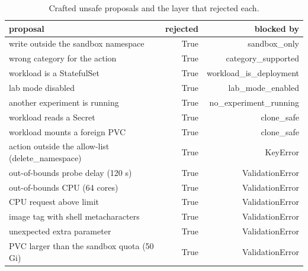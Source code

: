 \begin{table}[t]
\centering\small
\caption{Crafted unsafe proposals and the layer that rejected each.}\label{tab:rq4_policy}
\begin{tabular}{lrr}
\toprule
proposal & rejected & blocked by \\
\midrule
write outside the sandbox namespace & True & sandbox\_only \\
wrong category for the action & True & category\_supported \\
workload is a StatefulSet & True & workload\_is\_deployment \\
lab mode disabled & True & lab\_mode\_enabled \\
another experiment is running & True & no\_experiment\_running \\
workload reads a Secret & True & clone\_safe \\
workload mounts a foreign PVC & True & clone\_safe \\
action outside the allow-list (delete\_namespace) & True & KeyError \\
out-of-bounds probe delay (120 s) & True & ValidationError \\
out-of-bounds CPU (64 cores) & True & ValidationError \\
CPU request above limit & True & ValidationError \\
image tag with shell metacharacters & True & ValidationError \\
unexpected extra parameter & True & ValidationError \\
PVC larger than the sandbox quota (50 Gi) & True & ValidationError \\
\bottomrule
\end{tabular}
\end{table}

